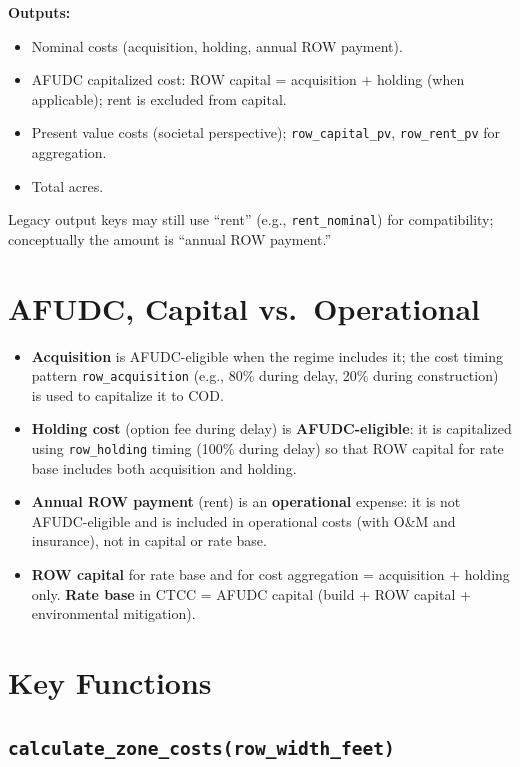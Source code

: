 \documentclass[ctcc_full_documentation.tex]{subfiles}
\begin{document}
\textbf{Outputs:}
\begin{itemize}
    \item Nominal costs (acquisition, holding, annual ROW payment).
    \item AFUDC capitalized cost: ROW capital = acquisition + holding (when applicable); rent is excluded from capital.
    \item Present value costs (societal perspective); \texttt{row\_capital\_pv}, \texttt{row\_rent\_pv} for aggregation.
    \item Total acres.
\end{itemize}

Legacy output keys may still use ``rent'' (e.g., \texttt{rent\_nominal}) for compatibility; conceptually the amount is ``annual ROW payment.''

\section{AFUDC, Capital vs.\ Operational}

\begin{itemize}
    \item \textbf{Acquisition} is AFUDC-eligible when the regime includes it; the cost timing pattern \texttt{row\_acquisition} (e.g., 80\% during delay, 20\% during construction) is used to capitalize it to COD.
    \item \textbf{Holding cost} (option fee during delay) is \textbf{AFUDC-eligible}: it is capitalized using \texttt{row\_holding} timing (100\% during delay) so that ROW capital for rate base includes both acquisition and holding.
    \item \textbf{Annual ROW payment} (rent) is an \textbf{operational} expense: it is not AFUDC-eligible and is included in operational costs (with O\&M and insurance), not in capital or rate base.
    \item \textbf{ROW capital} for rate base and for cost aggregation = acquisition + holding only. \textbf{Rate base} in CTCC = AFUDC capital (build + ROW capital + environmental mitigation).
\end{itemize}

\section{Key Functions}

\subsection{\texttt{calculate\_zone\_costs(row\_width\_feet)}}
\end{document}
